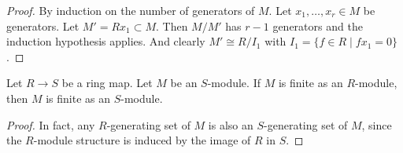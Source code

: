 \begin{proof}
By induction on the number of generators of $M$. Let
$x_1, \ldots, x_r \in M$ be generators.
Let $M' = Rx_1 \subset M$. Then $M/M'$ has $r - 1$ generators
and the induction hypothesis applies. And clearly $M' \cong R/I_1$
with $I_1 = \{f \in R \mid fx_1 = 0\}$.
\end{proof}

\begin{lemma}
\label{lemma-finite-over-subring}
Let $R \to S$ be a ring map.
Let $M$ be an $S$-module.
If $M$ is finite as an $R$-module, then $M$ is finite as an $S$-module.
\end{lemma}

\begin{proof}
In fact, any $R$-generating set of $M$ is also an $S$-generating set of
$M$, since the $R$-module structure is induced by the image of $R$ in $S$.
\end{proof}



